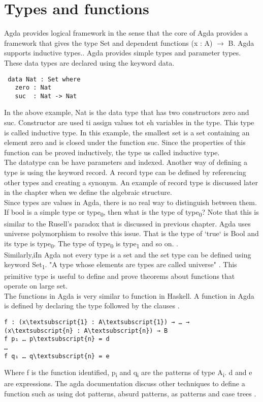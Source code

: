 \section{Types and functions}
Agda provides logical framework in the sense that the core of Agda provides a framework that gives the type Set and dependent functions (x : A) \(\rightarrow\) B. Agda supports inductive types.\cite{10.1007/978-3-642-03359-9_6}. Agda provides simple types and parameter types. These data types are declared using the keyword data. \\
\begin{Verbatim}
 data Nat : Set where
   zero : Nat
   suc  : Nat -> Nat
\end{Verbatim}
In the above example, Nat is the data type that has two constructors zero and suc. Constructor are used ti assign values tot eh variables in the type. This type is called inductive type. In this example, the smallest set is a set containing an element zero and is closed under the function suc. Since the properties of this function can be proved inductively, the type us called inductive type. \cite{enwiki:1127496533}\\ The datatype can be have parameters and	 indexed.  
Another way of defining a type is using the keyword record. A record type can be defined by referencing other types and creating a synonym. An example of record type is discussed later in the chapter when we define the algebraic structure.\\
Since types are values in Agda, there is no real way to distinguish between them. If bool is a simple type or type\textsubscript{0}, then what is the type of type\textsubscript{0}? Note that this is similar to the Rusell's paradox that is discussed in previous chapter. Agda uses universe polymorphism to resolve this issue. That is the type of `true` is Bool and its type is type\textsubscript{0}. The type of  type\textsubscript{0} is type\textsubscript{1} and so on. \cite{kidney2020finiteness}.\\
Similarly,iIn Agda not every type is a set and the set type can be defined using keyword Set\textsubscript{1}. "A type whose elements are types are called universe" \cite{universeagda}. This primitive type is useful to define and prove theorems about functions that operate on large set.\\

The functions in Agda is very similar to function in Haskell. A function in Agda is defined by declaring the type followed by the clauses \cite{agdaFunction}. 
\begin{Verbatim}[commandchars=\\\{\},samepage=true]
f : (x\textsubscript{1} : A\textsubscript{1}) → … → (x\textsubscript{n} : A\textsubscript{n}) → B
f p₁ … p\textsubscript{n} = d
…
f q₁ … q\textsubscript{n} = e
\end{Verbatim} 
Where f is the function identified, p\textsubscript{i} and q\textsubscript{i} are the patterns of type A\textsubscript{i}. d and e are expressions. 
The agda documentation discuss other techniques to define a function such as using dot patterns, absurd patterns, as patterns and case trees \cite{agdaFunction}.\\

